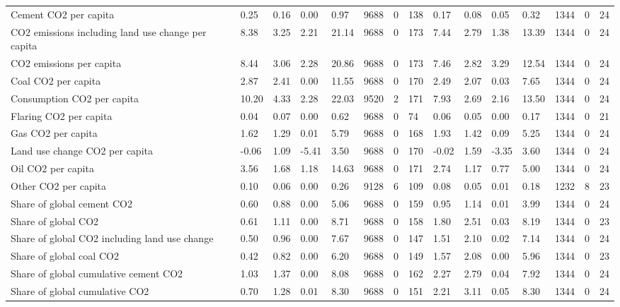 \begin{longtable}{lllllllllllllll}
\addlinespace
Cement CO2 per capita & 0.25 & 0.16 & 0.00 & 0.97 & 9688 & 0 & 138 & 0.17 & 0.08 & 0.05 & 0.32 & 1344 & 0 & 24\\
CO2 emissions including land use change per capita & 8.38 & 3.25 & 2.21 & 21.14 & 9688 & 0 & 173 & 7.44 & 2.79 & 1.38 & 13.39 & 1344 & 0 & 24\\
CO2 emissions per capita & 8.44 & 3.06 & 2.28 & 20.86 & 9688 & 0 & 173 & 7.46 & 2.82 & 3.29 & 12.54 & 1344 & 0 & 24\\
Coal CO2 per capita & 2.87 & 2.41 & 0.00 & 11.55 & 9688 & 0 & 170 & 2.49 & 2.07 & 0.03 & 7.65 & 1344 & 0 & 24\\
Consumption CO2 per capita & 10.20 & 4.33 & 2.28 & 22.03 & 9520 & 2 & 171 & 7.93 & 2.69 & 2.16 & 13.50 & 1344 & 0 & 24\\
\addlinespace
Flaring CO2 per capita & 0.04 & 0.07 & 0.00 & 0.62 & 9688 & 0 & 74 & 0.06 & 0.05 & 0.00 & 0.17 & 1344 & 0 & 21\\
Gas CO2 per capita & 1.62 & 1.29 & 0.01 & 5.79 & 9688 & 0 & 168 & 1.93 & 1.42 & 0.09 & 5.25 & 1344 & 0 & 24\\
Land use change CO2 per capita & -0.06 & 1.09 & -5.41 & 3.50 & 9688 & 0 & 170 & -0.02 & 1.59 & -3.35 & 3.60 & 1344 & 0 & 24\\
Oil CO2 per capita & 3.56 & 1.68 & 1.18 & 14.63 & 9688 & 0 & 171 & 2.74 & 1.17 & 0.77 & 5.00 & 1344 & 0 & 24\\
Other CO2 per capita & 0.10 & 0.06 & 0.00 & 0.26 & 9128 & 6 & 109 & 0.08 & 0.05 & 0.01 & 0.18 & 1232 & 8 & 23\\
\addlinespace
Share of global cement CO2 & 0.60 & 0.88 & 0.00 & 5.06 & 9688 & 0 & 159 & 0.95 & 1.14 & 0.01 & 3.99 & 1344 & 0 & 24\\
Share of global CO2 & 0.61 & 1.11 & 0.00 & 8.71 & 9688 & 0 & 158 & 1.80 & 2.51 & 0.03 & 8.19 & 1344 & 0 & 23\\
Share of global CO2 including land use change & 0.50 & 0.96 & 0.00 & 7.67 & 9688 & 0 & 147 & 1.51 & 2.10 & 0.02 & 7.14 & 1344 & 0 & 24\\
Share of global coal CO2 & 0.42 & 0.82 & 0.00 & 6.20 & 9688 & 0 & 149 & 1.57 & 2.08 & 0.00 & 5.96 & 1344 & 0 & 23\\
Share of global cumulative cement CO2 & 1.03 & 1.37 & 0.00 & 8.08 & 9688 & 0 & 162 & 2.27 & 2.79 & 0.04 & 7.92 & 1344 & 0 & 24\\
\addlinespace
Share of global cumulative CO2 & 0.70 & 1.28 & 0.01 & 8.30 & 9688 & 0 & 151 & 2.21 & 3.11 & 0.05 & 8.30 & 1344 & 0 & 24\\

\end{longtable}
